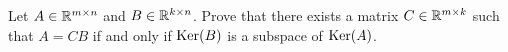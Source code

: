 \documentclass[11pt,nocut]{article}
\begin{document}
\vspace{5mm}

\begin{problem}[$\star$]
	Let $A \in \mathbb{R}^{m \times n}$ and $B \in \mathbb{R}^{k \times n}$. 
	Prove that there exists a matrix $C \in \mathbb{R}^{m \times k}$ such that $A = CB$ if and only if ${{\rm Ker}}(B)$ is a subspace of ${{\rm Ker}}(A)$.
\end{problem}

\vspace{1mm}

\vspace{1cm}
\centerline{}

%
%
\end{document}
